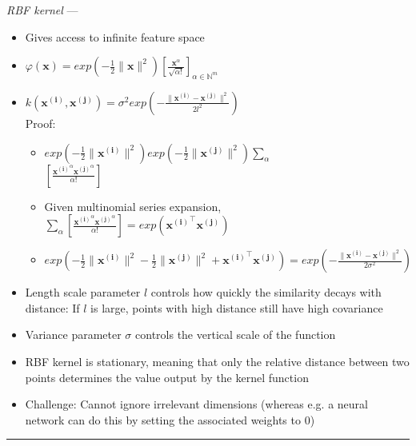 \emph{RBF kernel} ---
\begin{itemize}
    \item Gives access to infinite feature space
    \item $\varphi(\boldsymbol{x}) = exp ( -\frac{1}{2} \|\boldsymbol{x}\|^2 ) [ \frac{ \boldsymbol{x}^\alpha }{ \sqrt{\alpha!} } ]_{\alpha \in \mathbb{N}^m}$ 
    \item $k( \boldsymbol{x^{(i)}}, \boldsymbol{x^{(j)}} ) = \sigma^2 exp (- \frac{ \| \boldsymbol{x^{(i)}} - \boldsymbol{x^{(j)}} \|^2 }{ 2l^2 } )$\\
    Proof:
    \begin{itemize}
        \item $exp ( -\frac{1}{2} \|\boldsymbol{x^{(i)}}\|^2 ) exp ( -\frac{1}{2} \|\boldsymbol{x^{(j)}}\|^2 ) \sum_\alpha$\\
        $[ \frac{ \boldsymbol{x^{(i)}}^\alpha \boldsymbol{x^{(j)}}^\alpha }{ \alpha! } ]$
        \item Given multinomial series expansion, $\sum_\alpha [ \frac{ \boldsymbol{x^{(i)}}^\alpha \boldsymbol{x^{(j)}}^\alpha }{ \alpha! } ] = exp(\boldsymbol{x^{(i)}}^\intercal \boldsymbol{x^{(j)}})$
        \item $exp ( -\frac{1}{2} \|\boldsymbol{x^{(i)}}\|^2  -\frac{1}{2} \|\boldsymbol{x^{(j)}}\|^2 + \boldsymbol{x^{(i)}}^\intercal \boldsymbol{x^{(j)}}) = exp (- \frac{ \| \boldsymbol{x^{(i)}} - \boldsymbol{x^{(j)}} \|^2 }{ 2\sigma^2 } )$
    \end{itemize}
    \item Length scale parameter $l$ controls how quickly the similarity decays with distance: If $l$ is large, points with high distance still have high covariance
    \item Variance parameter $\sigma$ controls the vertical scale of the function
    \item RBF kernel is stationary, meaning that only the relative distance between two points determines the value output by the kernel function
    \item Challenge: Cannot ignore irrelevant dimensions (whereas e.g. a neural network can do this by setting the associated weights to $0$)
\end{itemize}

{\color{lightgray}\hrule height 0.001mm}

